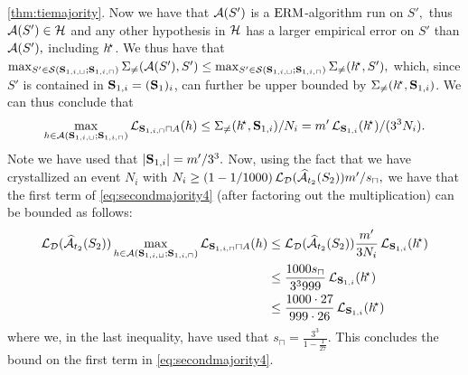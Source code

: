\begin{proofof}{\cref{thm:tiemajority}.}
Now we have that $ \mathcal{A}(S') $ is a $ \mathrm{ERM} $-algorithm run on $ S',$ thus $ \mathcal{A}(S') \in \mathcal{H} $ and any other hypothesis in $ \mathcal{H} $ has a larger empirical error on $ S' $ than $ \mathcal{A}(S'), $ including $ h^{\negmedspace\star}$. We thus have that $ \max_{S'\in \mathcal{S}(\mathbf{S}_{1,i,\sqcup};\mathbf{S}_{1,i,\sqcap})} \Sigma_{\not=}(\mathcal{A}(S'),S') \leq \max_{S'\in \mathcal{S}(\mathbf{S}_{1,i,\sqcup};\mathbf{S}_{1,i,\sqcap})} \Sigma_{\not=}(h^{\negmedspace\star},S'),$ which, since $ S' $ is contained in $ \mathbf{S}_{1,i}=(\mathbf{S}_{1})_{i} $, can further be upper bounded by $ \Sigma_{\not=}(h^{\negmedspace\star},\mathbf{S}_{1,i})$. We can thus conclude that 
\[ \max_{h\in \mathcal{A}(\mathbf{S}_{1,i,\sqcup};\mathbf{S}_{1,i,\sqcap})}\operatorname{\mathcal{L}}_{\mathbf{S}_{1,i,\sqcap}\sqcap A}(h)\leq  \Sigma_{\not=}(h^{\negmedspace\star},\mathbf{S}_{1,i})/N_{i}=m'\operatorname{\mathcal{L}}_{\mathbf{S}_{1,i}}(h^{\negmedspace\star})/(3^3N_{i}). \] Note we have used that $ |\mathbf{S}_{1,i}|=m'/3^{3}.$  
Now, using the fact that we have crystallized an event $N_i$ with
$ N_{i}\geq  (1-1/1000)\operatorname{\mathcal{L}}_{\mathcal{D}}(\widehat{\mathcal{A}}_{t_{2}}(S_{2}))m'/s_{\sqcap},$ we have that the first term of \cref{eq:secondmajority4} (after factoring out the multiplication) can be bounded as follows:
\begin{align}\label{eq:secondmajority5}
\operatorname{\mathcal{L}}_{\mathcal{D}}(\widehat{\mathcal{A}}_{t_{2}}(S_{2}))\max_{h\in \mathcal{A}(\mathbf{S}_{1,i,\sqcup};\mathbf{S}_{1,i,\sqcap})}\operatorname{\mathcal{L}}_{\mathbf{S}_{1,i,\sqcap}\sqcap A}(h)
& \leq
\operatorname{\mathcal{L}}_{\mathcal{D}}(\widehat{\mathcal{A}}_{t_{2}}(S_{2}))\frac{m'}{3N_{i}}\operatorname{\mathcal{L}}_{\mathbf{S}_{1,i}}(h^{\negmedspace\star}) \nonumber \\ 
& \leq \frac{1000s_{\sqcap}}{3^{3}999}\operatorname{\mathcal{L}}_{\mathbf{S}_{1,i}}(h^{\negmedspace\star}) \nonumber 
\\
& \leq \frac{1000\cdot27}{999\cdot26}\operatorname{\mathcal{L}}_{\mathbf{S}_{1,i}}(h^{\negmedspace\star})
\end{align}     
where we, in the last inequality, have used that $ s_{\sqcap}=\frac{3^{3}}{1-\frac{1}{27}}$. This concludes the bound on the first term in \cref{eq:secondmajority4}.


\end{proofof}

